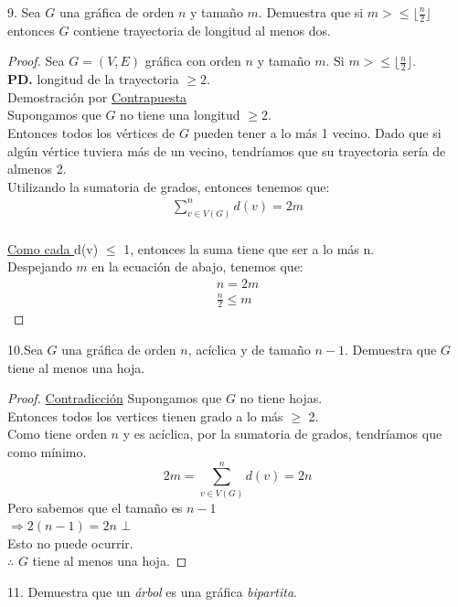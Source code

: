 \documentclass{article}
\begin{document}
    \begin{justify}
      9. Sea $G$ una gráfica de orden $n$ y tamaño $m$. Demuestra que si $m > \leq \lfloor \frac{n}{2} \rfloor$\\
      entonces $G$ contiene trayectoria de longitud al menos dos.
    \end{justify}
    \begin{proof}
      Sea $G = (V,E)$ gráfica con orden $n$ y tamaño $m$. Si $m > \leq \lfloor \frac{n}{2} \rfloor$.\\ \textbf{PD.} longitud de la trayectoria
      $\geqslant 2$. \\
      Demostración por \underline{Contrapuesta} \\
      Supongamos que $G$ no tiene una longitud $\geqslant 2$. \\
      Entonces todos los vértices de $G$ pueden tener a lo más 1 vecino. Dado que si algún vértice tuviera más de un vecino, tendríamos que
      su trayectoria sería de almenos 2. \\
      Utilizando la sumatoria de grados, entonces tenemos que:
      \begin{align}
        \sum_{v \in V(G)}^{n} d(v) = 2m \\
      \end{align}
      
      \underline{Como cada } d(v) $\leq$ 1, entonces la suma tiene que ser a lo más n. \\
      Despejando $m$ en la ecuación de abajo, tenemos que: 
      \begin{align}
        n = 2m\\
        \frac{n}{2} \leq m
      \end{align}
    \end{proof}
    \newpage
    \begin{justify}
      10.Sea $G$ una gráfica de orden $n$, acíclica y de tamaño $n-1$. Demuestra que $G$ tiene al menos una hoja.
      \begin{proof} \underline{Contradicción}
        Supongamos que $G$ no tiene hojas. \\
        Entonces todos los vertices tienen grado a lo más $\geq$ 2. \\
        Como tiene orden $n$ y es acíclica, por la sumatoria de grados, tendríamos que como mínimo. \\
        \begin{equation}
          2m = \sum_{v \in V(G)}^ n d(v) = 2n
        \end{equation}
        Pero sabemos que el tamaño es $n-1$ \\
        $\Longrightarrow 2(n-1) = 2n$ $\bot$ \\
        Esto no puede ocurrir. \\
        $\therefore$ $G$ tiene al menos una hoja.

      \end{proof}
    \end{justify}
  11. Demuestra que un \textit{árbol} es una gráfica \textit{bipartita}.
  
\end{document}
